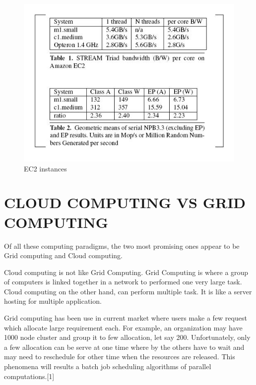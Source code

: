 \documentclass[conference, compsoc]{IEEEtran}
\begin{document}
\begin{figure}
\center
\includegraphics[scale=0.40]{EC2 instances.jpg}
\caption{EC2 instances}
\end{figure}


\vspace{.4cm}	
\section{CLOUD COMPUTING VS GRID COMPUTING}

Of all these computing paradigms, the two most promising ones appear to be Grid computing and Cloud computing.

Cloud computing is not like Grid Computing. Grid Computing is where a group of computers is linked together in a network to performed one very large task. Cloud computing on the other hand, can perform multiple task. It is like a server hosting for multiple application. 

Grid computing has been use in current market where users make a few request which allocate large requirement each. For example, an organization may have 1000  node cluster and group it to few allocation, let say 200.  Unfortunately, only a few allocation can be serve at one time where by the others have to wait and may need to reschedule for other time when the resources are released. This phenomena will results a batch job scheduling algorithms of parallel computations.[1]
\end{document}
